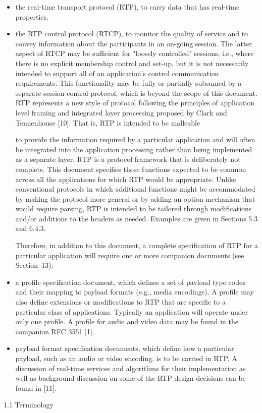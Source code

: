 \documentclass{article}
\begin{document}
\begin{itemize}
\item the real-time transport protocol (RTP), to carry data that has real-time properties.
\item the RTP control protocol (RTCP), to monitor the quality of service and to convey information about the participants in an on-going session.  The latter aspect of RTCP may be sufficient for "loosely controlled" sessions, i.e., where there is no explicit membership control and set-up, but it is not necessarily intended to support all of an application's control communication requirements.  This functionality may be fully or partially subsumed by a separate session control protocol, which is beyond the scope of this document.
RTP represents a new style of protocol following the principles of application level framing and integrated layer processing proposed by Clark and Tennenhouse [10].  That is, RTP is intended to be malleable

to provide the information required by a particular application and will often be integrated into the application processing rather than being implemented as a separate layer.  RTP is a protocol framework that is deliberately not complete.  This document specifies those functions expected to be common across all the applications for which RTP would be appropriate.  Unlike conventional protocols in which additional functions might be accommodated by making the protocol more general or by adding an option mechanism that would require parsing, RTP is intended to be tailored through modifications and/or additions to the headers as needed.  Examples are given in Sections 5.3 and 6.4.3.

Therefore, in addition to this document, a complete specification of RTP for a particular application will require one or more companion documents (see Section~13):

\item a profile specification document, which defines a set of payload type codes and their mapping to payload formats (e.g., media encodings).  A profile may also define extensions or modifications to RTP that are specific to a particular class of applications. Typically an application will operate under only one profile.  A profile for audio and video data may be found in the companion RFC 3551 [1].
\item payload format specification documents, which define how a particular payload, such as an audio or video encoding, is to be carried in RTP.
A discussion of real-time services and algorithms for their implementation as well as background discussion on some of the RTP design decisions can be found in [11].

\end{itemize}
1.1 Terminology
\end{document}
